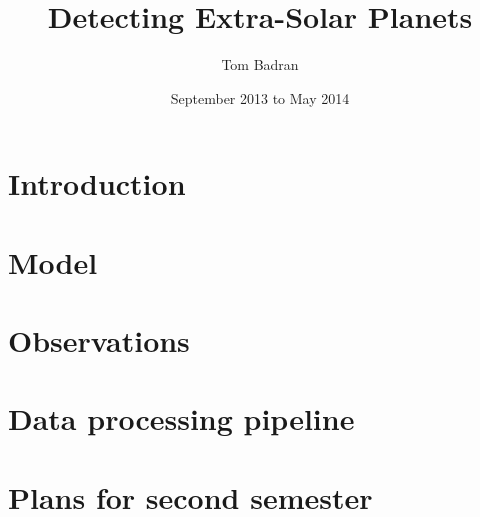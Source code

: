 \documentclass[a4paper]{article}
\title{Detecting Extra-Solar Planets}
\author{Tom Badran}
\date{September 2013 to May 2014}
\numberwithin{equation}{section}
\begin{document}
\maketitle

\tableofcontents
\listoffigures
\listoftables

% 

\section{Introduction}


\section{Model}


\section{Observations}


\section{Data processing pipeline}


\section{Plans for second semester}




\break
\appendix
{}


\end{document}

